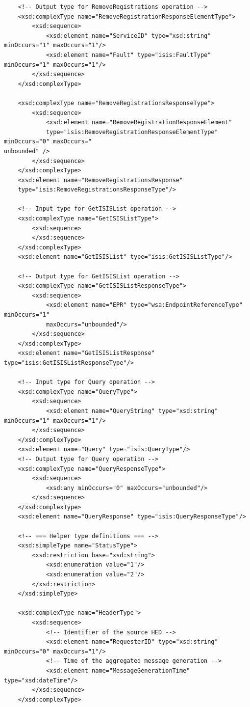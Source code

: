 \documentclass{book}
\begin{document}
\begin{verbatim}
    <!-- Output type for RemoveRegistrations operation -->
    <xsd:complexType name="RemoveRegistrationResponseElementType">
        <xsd:sequence>
            <xsd:element name="ServiceID" type="xsd:string" minOccurs="1" maxOccurs="1"/>
            <xsd:element name="Fault" type="isis:FaultType" minOccurs="1" maxOccurs="1"/>
        </xsd:sequence>
    </xsd:complexType>

    <xsd:complexType name="RemoveRegistrationsResponseType">
        <xsd:sequence>
            <xsd:element name="RemoveRegistrationResponseElement" 
            type="isis:RemoveRegistrationResponseElementType" minOccurs="0" maxOccurs="
unbounded" />
        </xsd:sequence>
    </xsd:complexType>
    <xsd:element name="RemoveRegistrationsResponse" 
    type="isis:RemoveRegistrationsResponseType"/>

    <!-- Input type for GetISISList operation -->
    <xsd:complexType name="GetISISListType">
        <xsd:sequence>
        </xsd:sequence>
    </xsd:complexType>
    <xsd:element name="GetISISList" type="isis:GetISISListType"/>

    <!-- Output type for GetISISList operation -->
    <xsd:complexType name="GetISISListResponseType">
        <xsd:sequence>
            <xsd:element name="EPR" type="wsa:EndpointReferenceType" minOccurs="1" 
            maxOccurs="unbounded"/>
        </xsd:sequence>
    </xsd:complexType>
    <xsd:element name="GetISISListResponse" type="isis:GetISISListResponseType"/>

    <!-- Input type for Query operation -->
    <xsd:complexType name="QueryType">
        <xsd:sequence>
            <xsd:element name="QueryString" type="xsd:string" minOccurs="1" maxOccurs="1"/>
        </xsd:sequence>
    </xsd:complexType>
    <xsd:element name="Query" type="isis:QueryType"/>
    <!-- Output type for Query operation -->
    <xsd:complexType name="QueryResponseType">
        <xsd:sequence>
            <xsd:any minOccurs="0" maxOccurs="unbounded"/>
        </xsd:sequence>
    </xsd:complexType>
    <xsd:element name="QueryResponse" type="isis:QueryResponseType"/>

    <!-- === Helper type definitions === -->
    <xsd:simpleType name="StatusType">
        <xsd:restriction base="xsd:string">
            <xsd:enumeration value="1"/>
            <xsd:enumeration value="2"/>
        </xsd:restriction>
    </xsd:simpleType>

    <xsd:complexType name="HeaderType">
        <xsd:sequence>
            <!-- Identifier of the source HED -->
            <xsd:element name="RequesterID" type="xsd:string" minOccurs="0" maxOccurs="1"/>
            <!-- Time of the aggregated message generation -->
            <xsd:element name="MessageGenerationTime" type="xsd:dateTime"/>
        </xsd:sequence>
    </xsd:complexType>


\end{verbatim}
\end{document}
